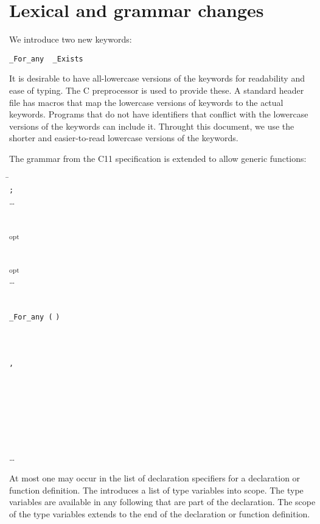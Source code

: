 \section{Lexical and grammar changes}
 We introduce two new keywords:
\begin{lstlisting}
_For_any  _Exists
\end{lstlisting}
It is desirable to have all-lowercase versions of the
keywords for readability and ease of typing. The C
preprocessor is used to provide these. A standard header
file  has macros that map the 
lowercase versions of keywords to the actual keywords.
Programs that do not have identifiers that conflict with the
lowercase versions of the keywords can include it.
Throught this document, we use the shorter and easier-to-read
lowercase versions of the keywords.

The grammar from the C11 specification \cite{ISO2011} is extended to allow
generic functions:
\begin{tabbing}
\=\\
\>  \texttt{;} \\
\>\ldots{} \\
\\
\\
\>   
  \textsubscript{opt} \\
\\
\\
\> \textsubscript{opt} \\
\>\ldots{} \\
\\
\\
\>\texttt{\_For\_any (}  \texttt{)} \\
\\
 \\
\> \\
\> \texttt{,} \\
\\
 \\
\> \\
\\
\\
 \\
\> \\
\>\ldots{} \\
\end{tabbing}
At most one  may occur in the list of declaration specifiers
for a declaration or function definition.
The  introduces a list of type variables into scope.  
The type variables are available in any following  that are part
of the declaration.  The scope of the type variables extends to the end of
the declaration or function definition.



